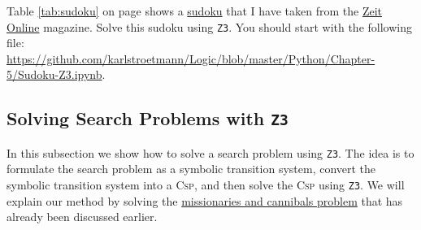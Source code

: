 \exerciseEng
{}
Table \ref{tab:sudoku} on page \pageref{tab:sudoku} shows a \href{https://en.wikipedia.org/wiki/Sudoku}{sudoku}
that I have taken from the
\href{http://sudoku.zeit.de/cgi-bin/sudoku/sudoku_kd_app_2016.pl?action=level&kd_nr=24091123601092&year=2018&month=03&day=23&level=-c+5}{Zeit Online}
magazine.
Solve this sudoku using \texttt{Z3}.  You should start with the following file:
\\[0.2cm]
\hspace*{0.0cm}
\href{https://github.com/karlstroetmann/Logic/blob/master/Python/Chapter-5/Sudoku-Z3.ipynb}{https://github.com/karlstroetmann/Logic/blob/master/Python/Chapter-5/Sudoku-Z3.ipynb}.
    \eox

\subsection{Solving Search Problems with \texttt{Z3}}
In this subsection we show how to solve a search problem using \texttt{Z3}.  The idea is to formulate the
search problem as a symbolic transition system, convert the symbolic transition system into a \textsc{Csp}, and
then solve the \textsc{Csp} using \texttt{Z3}.
We will explain our method by solving the
\href{https://en.wikipedia.org/wiki/Missionaries_and_cannibals_problem}{missionaries and cannibals problem}
that has already been discussed earlier.  

